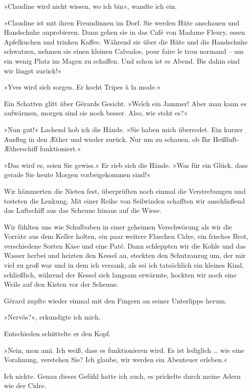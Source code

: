 »Claudine wird nicht wissen, wo ich bin«, wandte ich ein.

»Claudine ist mit ihren Freundinnen im Dorf. Sie werden Hüte
anschauen und Handschuhe anprobieren. Dann gehen sie in das Café
von Madame Fleury, essen Apfelkuchen und trinken Kaffee. Während
sie über die Hüte und die Handschuhe schwatzen, nehmen sie einen
kleinen Calvados, pour faire le trou normand – um ein wenig Platz
im Magen zu schaffen. Und schon ist es Abend. Bis dahin sind wir
längst zurück!«

»Yves wird sich sorgen. Er kocht Tripes à la mode.«

Ein Schatten glitt über Gérards Gesicht. »Welch ein Jammer! Aber
man kann es aufwärmen, morgen sind sie noch besser. Also, wie steht
es?«

»Nun gut!« Lachend hob ich die Hände. »Sie haben mich überredet.
Ein kurzer Ausflug in den Æther und wieder zurück. Nur um zu
schauen, ob Ihr Heißluft-Ætherschiff funktioniert.«

»Das wird es, seien Sie gewiss.« Er rieb sich die Hände. »Was für
ein Glück, dass gerade Sie heute Morgen vorbeigekommen sind!«

\bigpar

Wir hämmerten die Nieten fest, überprüften noch einmal die
Verstrebungen und testeten die Lenkung. Mit einer Reihe von
Seilwinden schafften wir anschließend das Luftschiff aus das
Scheune hinaus auf die Wiese.

Wir fühlten uns wie Schulbuben in einer geheimen Verschwörung als
wir die Vorräte aus dem Keller holten, ein paar weitere Flaschen
Cidre, ein frisches Brot, verschiedene Sorten Käse und eine Paté.
Dann schleppten wir die Kohle und das Wasser herbei und heizten den
Kessel an, steckten den Schutzanzug um, der mir viel zu groß war
und in dem ich versank, als sei ich tatsächlich ein kleines Kind,
schließlich, während der Kessel sich langsam erwärmte, hockten wir
noch eine Weile auf den Kisten vor der Scheune.

Gérard zupfte wieder einmal mit den Fingern an seiner Unterlippe
herum.

»Nervös?«, erkundigte ich mich.

Entschieden schüttelte er den Kopf.

»Nein, mon ami. Ich weiß, dass es funktionieren wird. Es ist
lediglich \ldots{} wie eine Vorahnung, verstehen Sie? Ich glaube, wir
werden ein Abenteuer erleben.«

Ich nickte. Genau dieses Gefühl hatte ich auch, es prickelte durch
meine Adern wie der Cidre.

